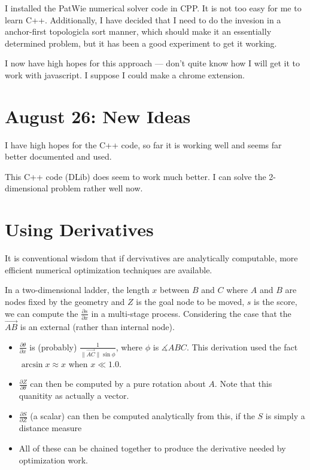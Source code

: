\documentclass[11pt]{article}
\begin{document}
I installed the PatWie numerical solver code in CPP.
It is not too easy for me to learn C++.  Additionally,
I have decided that I need to do the invesion in a anchor-first
topologicla sort manner, which should make it an essentially
determined problem, but it has been a good experiment to get it working.

I now have high hopes for this approach --- don't quite know how
I will get it to work with javascript.  I suppose I could make
a chrome extension.

\section{August 26: New Ideas}

I have high hopes for the C++ code, so far it is working well and seems
far better documented and used.

This C++ code (DLib) does seem to work much better.  I can solve the 2-dimensional
problem rather well now.

\section{Using Derivatives}

It is conventional wisdom that if dervivatives are analytically computable, more
efficient numerical optimization techniques are available.

In a two-dimensional ladder, the length $x$ between $B$ and $C$ where $A$ and $B$ are
nodes fixed by the geometry and $Z$ is the goal node to be moved, $s$ is the score, we can compute
the $\frac{\partial s}{\partial x}$ in a multi-stage process. Considering the case
that the $\vec{AB}$ is an external (rather than internal node).
\begin{itemize}
\item $\frac{\partial \theta}{\partial x}$ is (probably) $\frac{1}{\| \vec{AC} \| \sin{\phi}}$,
  where $\phi$ is $\measuredangle ABC$. This derivation used the fact $\arcsin{x} \approx x$ when
  $ x \ll 1.0$.
\item $\frac{\partial Z}{\partial \theta}$ can then be computed by a pure rotation about $A$. Note
  that this quanitity as actually a vector.
\item $\frac{\partial S}{\partial Z}$ (a scalar) can then be computed analytically from this, if the $S$ is simply
  a distance measure
\item All of these can be chained together to produce the derivative needed by optimization
  work.
\end{itemize}
\end{document}
